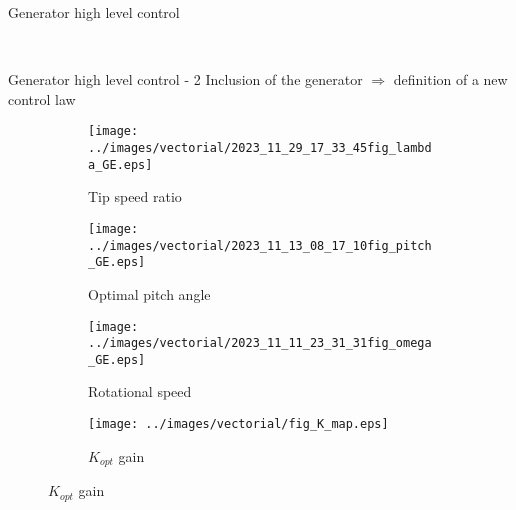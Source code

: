 \begin{frame}{Generator high level control}

  \begin{figure}
    \begin{subfigure}{\columnwidth}
      \centering
      \begingroup
        
      \endgroup
    \end{subfigure}
    \\
    \begin{subfigure}{\columnwidth}
      \centering
      \begingroup
        
      \endgroup
    \end{subfigure}
  \end{figure}

\end{frame}

\begin{frame}{Generator high level control - 2}
  Inclusion of the generator $\Rightarrow$ definition of a new control law \\
  \begin{figure}[!htbp]
    \begin{subfigure}{0.49\textwidth}
      \centering
      \texttt{[image: ../images/vectorial/2023\_11\_29\_17\_33\_45fig\_lambda\_GE.eps]}
      \caption{Tip speed ratio}
    \end{subfigure}
    \begin{subfigure}{0.49\textwidth}
      \centering
      \texttt{[image: ../images/vectorial/2023\_11\_13\_08\_17\_10fig\_pitch\_GE.eps]}
      \caption{Optimal pitch angle}
    \end{subfigure}
    \begin{subfigure}{0.49\textwidth}
      \centering
      \texttt{[image: ../images/vectorial/2023\_11\_11\_23\_31\_31fig\_omega\_GE.eps]}
      \caption{Rotational speed}
    \end{subfigure}
    \begin{subfigure}{0.49\textwidth}
      \centering
      \texttt{[image: ../images/vectorial/fig\_K\_map.eps]}
      \caption{$K_{opt}$ gain}
    \end{subfigure}
  \end{figure}
\end{frame}

